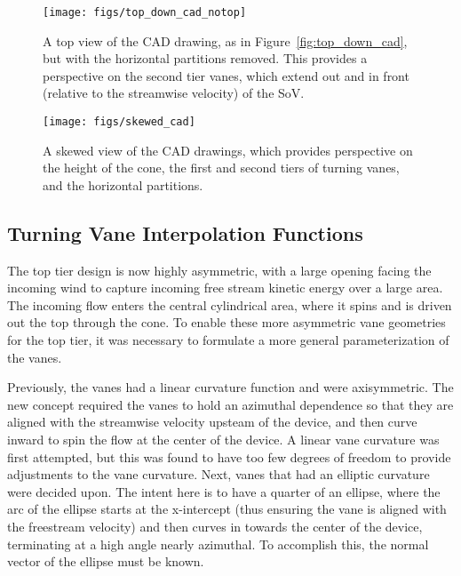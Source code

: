 \begin{figure}[!htb]
  \begin{center}
   \texttt{[image: figs/top\_down\_cad\_notop]}
   \caption{A top view of the CAD drawing, as in
   Figure~\ref{fig:top_down_cad}, but with the horizontal partitions
   removed. This provides a perspective on the second tier vanes, which
   extend out and in front (relative to the streamwise velocity) of the
   SoV.}
   \label{fig:top_down_cad_notop}
  \end{center}
 \end{figure}

\begin{figure}[!htb]
  \begin{center}
   \texttt{[image: figs/skewed\_cad]}
   \caption{A skewed view of the CAD drawings, which provides
   perspective on the height of the cone, the first and second tiers of 
   turning vanes, and the horizontal partitions.}
   \label{fig:cad_skewed}
  \end{center}
 \end{figure}

\subsection{Turning Vane Interpolation Functions}
\label{sec:interpolate}

The top tier design is now highly asymmetric, with a
large opening facing the incoming wind to capture incoming free stream
kinetic energy over a large area. The incoming flow enters the central
cylindrical area, where it spins and is driven out the top through the
cone. To enable these more asymmetric vane geometries for the top tier,
it was necessary to formulate a more general parameterization of the
vanes.

Previously, the vanes had a linear curvature function and were
axisymmetric. The new concept required the vanes to hold an azimuthal
dependence so that they are aligned with the streamwise velocity upsteam 
of the device, and then curve inward to spin the flow at the center of
the device. A linear vane curvature was first attempted, but this was
found to have too few degrees of freedom to provide adjustments to the
vane curvature. Next, vanes that had an elliptic curvature were decided
upon. The intent here is to have a quarter of an ellipse, where the arc
of the ellipse starts at the x-intercept (thus ensuring the vane is
aligned with the freestream velocity) and then curves in towards the
center of the device, terminating at a high angle nearly azimuthal. To
accomplish this, the normal vector of the ellipse must be known. 

